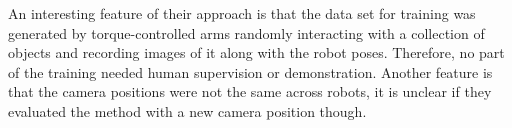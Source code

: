 An interesting feature of their approach is that the data set for training was
generated by torque-controlled arms randomly interacting with a collection of
objects and recording images of it along with the robot poses. Therefore, no
part of the training needed human supervision or demonstration. Another feature
is that the camera positions were not the same across robots, it is unclear if
they evaluated the method with a new camera position though.

% 
% 
% 
% 
% 
% 
